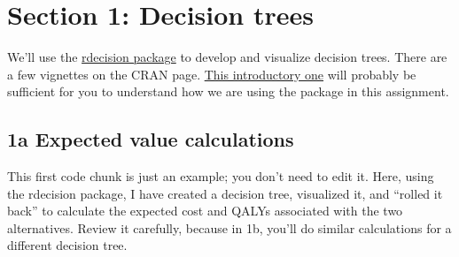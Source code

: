 \documentclass[
  letterpaper,
  DIV=11,
  numbers=noendperiod]{scrartcl}
\begin{document}
\hypertarget{section-1-decision-trees}{%
\section{Section 1: Decision trees}\label{section-1-decision-trees}}

We'll use the
\href{https://cran.r-project.org/web/packages/rdecision/index.html}{rdecision
package} to develop and visualize decision trees. There are a few
vignettes on the CRAN page.
\href{https://cran.rstudio.com/web/packages/rdecision/vignettes/DT00-DecisionTreeTutorial.html}{This
introductory one} will probably be sufficient for you to understand how
we are using the package in this assignment.

\hypertarget{a-expected-value-calculations}{%
\subsection{1a Expected value
calculations}\label{a-expected-value-calculations}}

This first code chunk is just an example; you don't need to edit it.
Here, using the rdecision package, I have created a decision tree,
visualized it, and ``rolled it back'' to calculate the expected cost and
QALYs associated with the two alternatives. Review it carefully, because
in 1b, you'll do similar calculations for a different decision tree.
\end{document}
